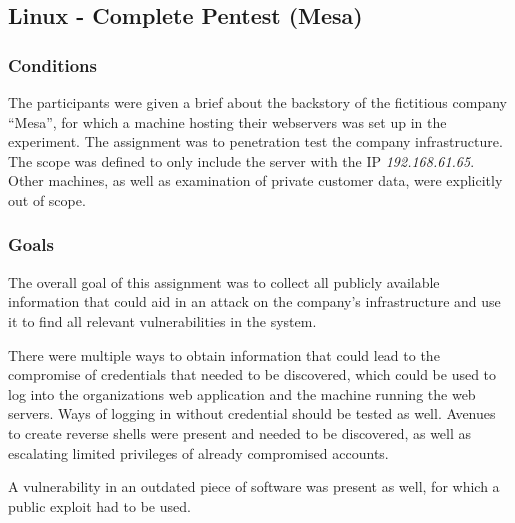 \documentclass[../report.tex]{subfiles}
\begin{document}
\subsection{Linux - Complete Pentest (Mesa)}
\subsubsection{Conditions}

The participants were given a brief about the backstory of the fictitious company \enquote{Mesa}, for which a machine hosting their webservers was set up in the experiment. The assignment was to penetration test the company infrastructure. The scope was defined to only include the server with the IP \textit{192.168.61.65}. Other machines, as well as examination of private customer data, were explicitly out of scope.

\subsubsection{Goals}
The overall goal of this assignment was to collect all publicly available information that could aid in an attack on the company's infrastructure and use it to find all relevant vulnerabilities in the system.

There were multiple ways to obtain information that could lead to the compromise of credentials that needed to be discovered, which could be used to log into the organizations web application and the machine running the web servers. Ways of logging in without credential should be tested as well.
Avenues to create reverse shells were present and needed to be discovered, as well as escalating limited privileges of already compromised accounts. 

A vulnerability in an outdated piece of software was present as well, for which a public exploit had to be used.
\end{document}
